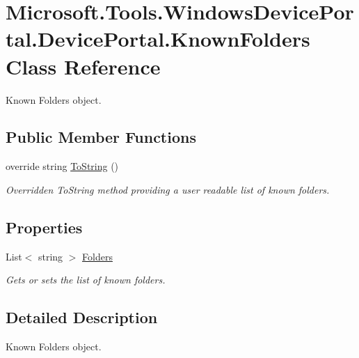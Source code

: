 \hypertarget{class_microsoft_1_1_tools_1_1_windows_device_portal_1_1_device_portal_1_1_known_folders}{}\section{Microsoft.\+Tools.\+Windows\+Device\+Portal.\+Device\+Portal.\+Known\+Folders Class Reference}
\label{class_microsoft_1_1_tools_1_1_windows_device_portal_1_1_device_portal_1_1_known_folders}


Known Folders object.  


\subsection*{Public Member Functions}
\begin{DoxyCompactItemize}
\item 
override string \hyperlink{class_microsoft_1_1_tools_1_1_windows_device_portal_1_1_device_portal_1_1_known_folders_a693e2b522befe9b6b54ca06bfe4e37fe}{To\+String} ()
\begin{DoxyCompactList}\small\item\em Overridden To\+String method providing a user readable list of known folders. \end{DoxyCompactList}\end{DoxyCompactItemize}
\subsection*{Properties}
\begin{DoxyCompactItemize}
\item 
List$<$ string $>$ \hyperlink{class_microsoft_1_1_tools_1_1_windows_device_portal_1_1_device_portal_1_1_known_folders_aee57203a66eec8a77b0af14b5e261e8c}{Folders}
\begin{DoxyCompactList}\small\item\em Gets or sets the list of known folders. \end{DoxyCompactList}\end{DoxyCompactItemize}


\subsection{Detailed Description}
Known Folders object. 



